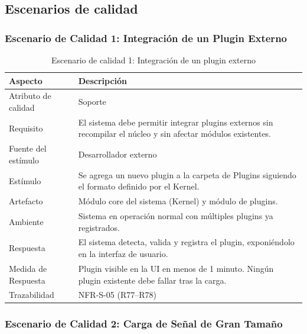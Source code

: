 \documentclass[11pt,a4paper]{article}
\DeclareRobustCommand{\_}{\textunderscore\allowbreak}
\begin{document}
\subsection{Escenarios de calidad}


\subsubsection{Escenario de Calidad 1: Integración de un Plugin Externo}

\begin{table}[H]
\centering
\caption{Escenario de calidad 1: Integración de un plugin externo}
\label{tab:escenario1}
\begin{tabularx}{\textwidth}{|l|X|}
\hline
\textbf{Aspecto} & \textbf{Descripción} \\
\hline
Atributo de calidad & Soporte \\
\hline
Requisito & El sistema debe permitir integrar plugins externos sin recompilar el núcleo y sin afectar módulos existentes. \\
\hline
Fuente del estímulo & Desarrollador externo \\
\hline
Estímulo & Se agrega un nuevo plugin a la carpeta de Plugins siguiendo el formato definido por el Kernel. \\
\hline
Artefacto & Módulo core del sistema (Kernel) y módulo de plugins. \\
\hline
Ambiente & Sistema en operación normal con múltiples plugins ya registrados. \\
\hline
Respuesta & El sistema detecta, valida y registra el plugin, exponiéndolo en la interfaz de usuario. \\
\hline
Medida de Respuesta & Plugin visible en la UI en menos de 1 minuto. Ningún plugin existente debe fallar tras la carga. \\
\hline
Trazabilidad & NFR-S-05 (R77--R78) \\
\hline
\end{tabularx}
\end{table}

\subsubsection{Escenario de Calidad 2: Carga de Señal de Gran Tamaño}
\end{document}
